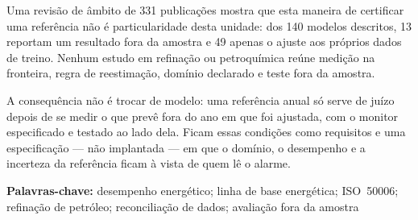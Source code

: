 Uma revisão de âmbito de 331 publicações mostra que esta maneira de certificar uma referência não é particularidade desta unidade: dos 140 modelos descritos, 13 reportam um resultado fora da amostra e 49 apenas o ajuste aos próprios dados de treino. Nenhum estudo em refinação ou petroquímica reúne medição na fronteira, regra de reestimação, domínio declarado e teste fora da amostra.

A consequência não é trocar de modelo: uma referência anual só serve de juízo depois de se medir o que prevê fora do ano em que foi ajustada, com o monitor especificado e testado ao lado dela. Ficam essas condições como requisitos e uma especificação --- não implantada --- em que o domínio, o desempenho e a incerteza da referência ficam à vista de quem lê o alarme.

\bigskip
\noindent\textbf{Palavras-chave:} desempenho energético; linha de base
energética; ISO~50006; refinação de petróleo; reconciliação de dados;
avaliação fora da amostra
